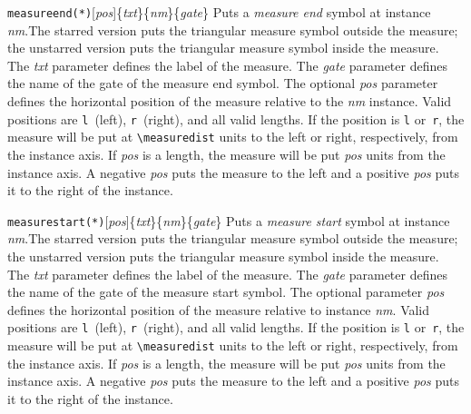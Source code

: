 \documentclass[a4paper]{article}
\newcommand{\cmd}[1]{\texttt{\bslash #1}}
\newcommand{\opt}[1]{[#1]}
\newenvironment{defs}{%
  \begin{list}{}%
              {\setlength{\labelwidth}{0pt}%
               \setlength{\labelsep}{1em}%
               \setlength{\leftmargin}{1em}%
               \setlength{\parsep}{1ex}%
               \setlength{\listparindent}{0pt}%
               \setlength{\rightmargin}{0pt}%
               \renewcommand{\makelabel}[1]{##1}%
               \raggedright%
              }%
  }{%
  \end{list}}
\begin{document}
\begin{defs}
\item[\cmd{measureend(*)}\opt{\emph{pos}}\{\emph{txt}\}\{\emph{nm}\}\{\emph{gate}\}]
Puts a \emph{measure end} symbol at instance \emph{nm}.The starred
version puts the triangular measure symbol outside the measure; the
unstarred version puts the triangular measure symbol inside the
measure. The \emph{txt} parameter defines the label of the
measure. The \emph{gate} parameter defines the name of the gate of the
measure end symbol.  The optional \emph{pos} parameter defines the
horizontal position of the measure relative to the
\emph{nm} instance. Valid positions are \verb|l|~(left), \verb|r|~(right), and
all valid lengths. If the position is \verb|l| or~\verb|r|, the
measure will be put at \verb|\measuredist| units to the left or right,
respectively, from the instance axis. If \emph{pos} is a length, the
measure will be put \emph{pos} units from the instance axis. A
negative \emph{pos} puts the measure to the left and a positive
\emph{pos} puts it to the right of the instance.

\item[\cmd{measurestart(*)}\opt{\emph{pos}}\{\emph{txt}\}\{\emph{nm}\}\{\emph{gate}\}]
Puts a \emph{measure start} symbol at instance \emph{nm}.The starred
version puts the triangular measure symbol outside the measure; the
unstarred version puts the triangular measure symbol inside the
measure. The \emph{txt} parameter defines the label of the
measure. The \emph{gate} parameter defines the name of the gate of the
measure start symbol.  The optional parameter \emph{pos} defines the
horizontal position of the measure relative to instance
\emph{nm}. Valid positions are \verb|l|~(left), \verb|r|~(right), and
all valid lengths. If the position is \verb|l| or~\verb|r|, the
measure will be put at \verb|\measuredist| units to the left or right,
respectively, from the instance axis. If \emph{pos} is a length, the
measure will be put \emph{pos} units from the instance axis. A
negative \emph{pos} puts the measure to the left and a positive
\emph{pos} puts it to the right of the instance.


\end{defs}
\end{document}
